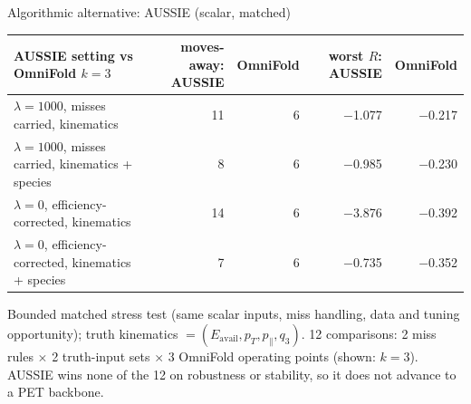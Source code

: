 \documentclass[aspectratio=169,10pt]{beamer}
\def\evidencetext{}
\begin{document}
\gdef\evidencetext{\texttt{scalar/results/SCALAR\_AUSSIE\_MATCHED-20260925.json}; \texttt{scalar/SCALAR\_AUSSIE\_MATCHED-20260925.md}}
\begin{frame}{Algorithmic alternative: AUSSIE (scalar, matched)}
{\scriptsize
\begin{tabular}{lrrrr}
\toprule
AUSSIE setting vs OmniFold $k{=}3$ & moves-away: AUSSIE & OmniFold & worst $R$: AUSSIE & OmniFold \\
\midrule
$\lambda{=}1000$, misses carried, kinematics & 11 & 6 & \ensuremath{-}1.077 & \ensuremath{-}0.217 \\
$\lambda{=}1000$, misses carried, kinematics + species & 8 & 6 & \ensuremath{-}0.985 & \ensuremath{-}0.230 \\
$\lambda{=}0$, efficiency-corrected, kinematics & 14 & 6 & \ensuremath{-}3.876 & \ensuremath{-}0.392 \\
$\lambda{=}0$, efficiency-corrected, kinematics + species & 7 & 6 & \ensuremath{-}0.735 & \ensuremath{-}0.352 \\
\bottomrule
\end{tabular}}\par\vspace{0.2cm}\small Bounded matched stress test (same scalar inputs, miss handling, data and tuning opportunity); truth kinematics $= (E_\mathrm{avail}, p_T, p_\parallel, q_3)$. 12 comparisons: 2 miss rules $\times$ 2 truth-input sets $\times$ 3 OmniFold operating points (shown: $k{=}3$). AUSSIE wins none of the 12 on robustness or stability, so it does not advance to a PET backbone.
\end{frame}
\end{document}
